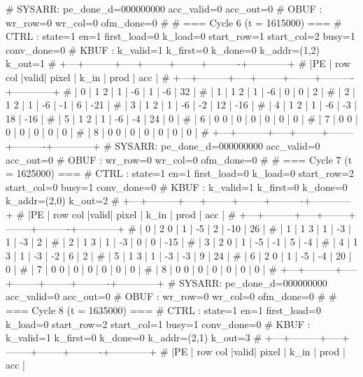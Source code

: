 # SYSARR: pe_done_d=000000000 acc_valid=0 acc_out=0
# OBUF : wr_row=0 wr_col=0 ofm_done=0
# 
# === Cycle 6  (t = 1615000) ===
# CTRL : state=1 en=1 first_load=0 k_load=0 start_row=1 start_col=2 busy=1 conv_done=0
# KBUF : k_valid=1 k_first=0 k_done=0 k_addr=(1,2) k_out=1
# +---+---------+-----+--------+--------+----------+------------+
# |PE | row col |valid| pixel  |  k_in  |   prod   |    acc     |
# +---+---------+-----+--------+--------+----------+------------+
# | 0 |   1   2 |  1  |     -6 |      1 |       -6 |         32 |
# | 1 |   1   2 |  1  |     -6 |      0 |        0 |          2 |
# | 2 |   1   2 |  1  |     -6 |     -1 |        6 |        -21 |
# | 3 |   1   2 |  1  |     -6 |     -2 |       12 |        -16 |
# | 4 |   1   2 |  1  |     -6 |     -3 |       18 |        -16 |
# | 5 |   1   2 |  1  |     -6 |     -4 |       24 |          0 |
# | 6 |   0   0 |  0  |      0 |      0 |        0 |          0 |
# | 7 |   0   0 |  0  |      0 |      0 |        0 |          0 |
# | 8 |   0   0 |  0  |      0 |      0 |        0 |          0 |
# +---+---------+-----+--------+--------+----------+------------+
# SYSARR: pe_done_d=000000000 acc_valid=0 acc_out=0
# OBUF : wr_row=0 wr_col=0 ofm_done=0
# 
# === Cycle 7  (t = 1625000) ===
# CTRL : state=1 en=1 first_load=0 k_load=0 start_row=2 start_col=0 busy=1 conv_done=0
# KBUF : k_valid=1 k_first=0 k_done=0 k_addr=(2,0) k_out=2
# +---+---------+-----+--------+--------+----------+------------+
# |PE | row col |valid| pixel  |  k_in  |   prod   |    acc     |
# +---+---------+-----+--------+--------+----------+------------+
# | 0 |   2   0 |  1  |     -5 |      2 |      -10 |         26 |
# | 1 |   1   3 |  1  |     -3 |      1 |       -3 |          2 |
# | 2 |   1   3 |  1  |     -3 |      0 |        0 |        -15 |
# | 3 |   2   0 |  1  |     -5 |     -1 |        5 |         -4 |
# | 4 |   1   3 |  1  |     -3 |     -2 |        6 |          2 |
# | 5 |   1   3 |  1  |     -3 |     -3 |        9 |         24 |
# | 6 |   2   0 |  1  |     -5 |     -4 |       20 |          0 |
# | 7 |   0   0 |  0  |      0 |      0 |        0 |          0 |
# | 8 |   0   0 |  0  |      0 |      0 |        0 |          0 |
# +---+---------+-----+--------+--------+----------+------------+
# SYSARR: pe_done_d=000000000 acc_valid=0 acc_out=0
# OBUF : wr_row=0 wr_col=0 ofm_done=0
# 
# === Cycle 8  (t = 1635000) ===
# CTRL : state=1 en=1 first_load=0 k_load=0 start_row=2 start_col=1 busy=1 conv_done=0
# KBUF : k_valid=1 k_first=0 k_done=0 k_addr=(2,1) k_out=3
# +---+---------+-----+--------+--------+----------+------------+
# |PE | row col |valid| pixel  |  k_in  |   prod   |    acc     |
